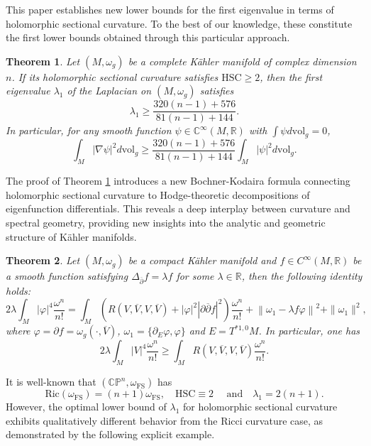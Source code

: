 \documentclass[12pt, reqno]{amsart}
\newcommand\bp{{\bar\partial}}
\theoremstyle{plain}
\newtheorem{thm}{Theorem}[section]
\theoremstyle{definition}
\newcommand{\btheorem}{\begin{thm}}
\newcommand{\etheorem}{\end{thm}}
\newcommand{\p}{\partial}
\renewcommand{\bar}{\overline}
\renewcommand{\phi}{\varphi}
\newcommand{\beq}{\begin{equation}}
\newcommand{\eeq}{\end{equation}}
\newcommand{\qtq}[1]{\quad\mbox{#1}\quad}
\renewcommand{\bp}{\bar{\partial}}
\renewcommand{\>}{\rightarrow}
\newcommand{\C}{{\mathbb C}}
\renewcommand{\P}{{\mathbb P}}
\newcommand{\R}{{\mathbb R}}
\renewcommand{\#}{\sharp}
\numberwithin{equation}{section} %
\begin{document}
	

This paper establishes new lower bounds for the first eigenvalue in terms of holomorphic sectional curvature.
To the best of our knowledge, these constitute the first lower bounds obtained through this particular approach.

\btheorem
\label{MainTheoremA}
Let $ (M,\omega_g) $ be a complete K\"ahler manifold of complex dimension $n$.
 If  its holomorphic sectional curvature satisfies $\mathrm{HSC}  \geq 2 $, then the first
 eigenvalue $\lambda_1$ of the Laplacian on $(M,\omega_g)$ satisfies \beq   \lambda_1 \geq \frac{320(n-1)+576}{81(n-1)+144}.\eeq 
 In particular,  for any smooth function $\psi \in \C^\infty(M,\R)$ with $\int \psi d\mathrm{vol}_g=0$,
 \beq \int_M| \nabla \psi|^2 d\mathrm{vol}_g\geq  \frac{320(n-1)+576}{81(n-1)+144} \int_M |\psi|^2  d\mathrm{vol}_g. \eeq 
\etheorem

\noindent The proof of Theorem \ref{MainTheoremA} introduces a new Bochner-Kodaira
 formula connecting holomorphic sectional curvature to
 Hodge-theoretic decompositions of eigenfunction differentials. This reveals a deep
  interplay between curvature and spectral geometry, providing new insights into the
  analytic and geometric structure of K\"ahler manifolds.
  \btheorem\label{identity}
  Let $ (M,\omega_g) $ be a compact K\"ahler manifold and  $ f \in C^{\infty}(M,\R) $ be a smooth  function
  satisfying $ \Delta_{\bp} f = \lambda f $ for some $\lambda\in \R$, then the following identity holds:
  \beq 2\lambda \int_M |\phi|^4 \frac{\omega^n}{n!} = \int_M \left( R(V,\bar V,V,\bar V)
  + |\phi|^2 |\p\bar\p f|^2\right) \frac{\omega^n}{n!} + \left\|\omega_1-\lambda f\phi\right\|^2 + \|\omega_1\|^2,\label{key7}\eeq
   where $ \phi = \p f=\omega_g(\cdot, \bar V)$,  
  $\omega_1 = \{ \p_E \phi, \phi \}$ and $E=T^{*1,0} M$.  In particular, one has
  \beq 2\lambda \int_M |V|^4 \frac{\omega^n}{n!} \geq  \int_M  R(V,\bar V,V,\bar V)\frac{\omega^n}{n!}. \label{inequality} \eeq


  \etheorem







  \noindent
   It is well-known that $\left(\C\P^n, \omega_{\mathrm{FS}}\right)$ has $$\mathrm{Ric}( \omega_{\mathrm{FS}})=(n+1) \omega_{\mathrm{FS}}, \quad \mathrm{HSC}\equiv2 \qtq{ and}  \lambda_1=2(n+1).$$ However, the optimal lower bound of
  $\lambda_1$ for holomorphic sectional curvature exhibits qualitatively different
  behavior from the Ricci curvature case, as demonstrated by the following explicit example.
\end{document}

